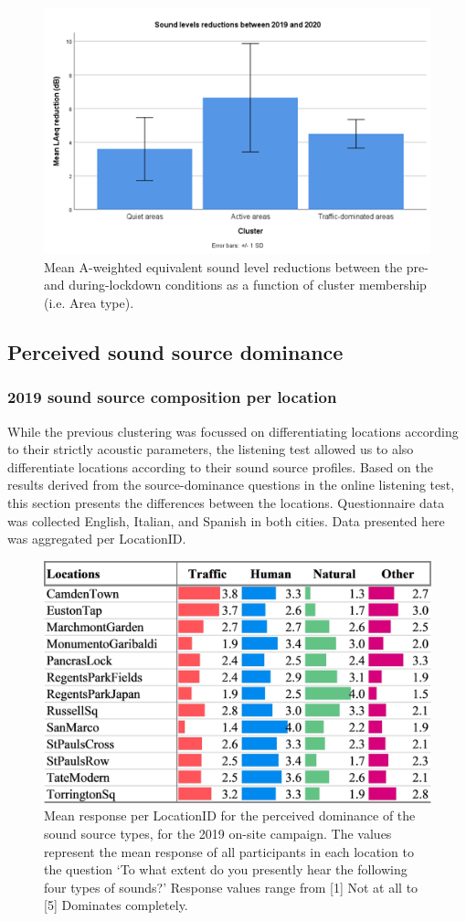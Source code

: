 \begin{figure}[h]
  \centering
  \includegraphics[width=.7\textwidth]{Figures/NoiseMappingLockdown Fig 8.png}
  \caption{Mean A-weighted equivalent sound level reductions between the pre- and during-lockdown conditions as a function of cluster membership (i.e. Area type). \label{fig:NsMapLockRedux}}
\end{figure}


 \subsection{Perceived sound source dominance}

   \subsubsection{2019 sound source composition per location}
  While the previous clustering was focussed on differentiating locations according to their strictly acoustic parameters, the listening test allowed us to also differentiate locations according to their sound source profiles. Based on the results derived from the source-dominance questions in the online listening test, this section presents the differences between the locations. Questionnaire data was collected English, Italian, and Spanish in both cities. Data presented here was aggregated per LocationID.


   \begin{figure}[h]
     \centering
     \includegraphics[width=.75\textwidth]{Figures/Lockdown-Fig2.jpg}
     \caption{Mean response per LocationID for the perceived dominance of the sound source types, for the 2019 on-site campaign. The values represent the mean response of all participants in each location to the question `To what extent do you presently hear the following four types of sounds?' Response values range from [1] Not at all to [5] Dominates completely. \label{fig:sound-source-dom}}
   \end{figure}

